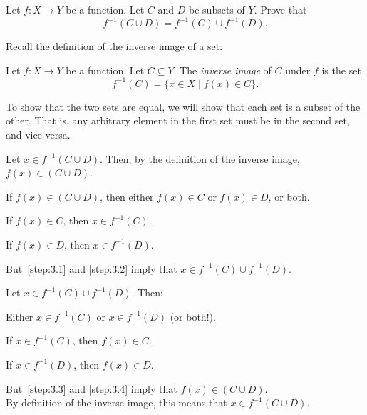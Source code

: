 \begin{problem}
  Let $f : X \to Y$ be a function.
  Let $C$ and $D$ be subsets of $Y$.
  Prove that \[ f^{-1}(C \cup D) = f^{-1}(C) \cup f^{-1}(D). \]
\end{problem}

\begin{answer}
  Recall the definition of the inverse image of a set:
  \begin{definition}
    Let $f : X \to Y$ be a function.
    Let $C \subseteq Y$.
    The \emph{inverse image} of $C$ under $f$ is the set
    \[ f^{-1}(C) = \{ x \in X \mid f(x) \in C \}. \]
  \end{definition}
  
  To show that the two sets are equal, we will show that each set is a subset
  of the other. That is, any arbitrary element in the first set must be in
  the second set, and vice versa.

  \begin{enumroman}
    \item Let $x \in f^{-1}(C \cup D)$. Then, by the definition of the inverse image,
      $f(x) \in (C \cup D)$.
      \begin{enumarabic}
        \item If $f(x) \in (C \cup D)$, then either $f(x) \in C$ or $f(x) \in D$, or both.
        \item If $f(x) \in C$, then $x \in f^{-1}(C)$.~\label{step:3.1}
        \item If $f(x) \in D$, then $x \in f^{-1}(D)$.~\label{step:3.2}
      \end{enumarabic}
      But~\ref{step:3.1} and \ref{step:3.2} imply that $x \in f^{-1}(C) \cup f^{-1}(D)$.

    \item Let $x \in f^{-1}(C) \cup f^{-1}(D)$. Then:
      \begin{enumarabic}
        \item Either $x \in f^{-1}(C)$ or $x \in f^{-1}(D)$ (or both!).
        \item If $x \in f^{-1}(C)$, then $f(x) \in C$.~\label{step:3.3}
        \item If $x \in f^{-1}(D)$, then $f(x) \in D$.~\label{step:3.4}
      \end{enumarabic}
      But~\ref{step:3.3} and \ref{step:3.4} imply that $f(x) \in (C \cup D)$. \\
      By definition of the inverse image, this means that $x \in f^{-1}(C \cup D)$.
  \end{enumroman}


\end{answer}
